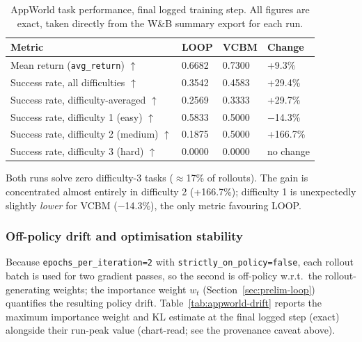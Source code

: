 \begin{table}[H]
  \centering
  \caption{AppWorld task performance, final logged training step. All figures are exact, taken directly from the W\&B summary export for each run.}
  \label{tab:appworld-results}
  \begin{tabularx}{\linewidth}{@{}l Z Z Z@{}}
    \toprule
    \textbf{Metric}                                & \textbf{LOOP} & \textbf{VCBM} & \textbf{Change} \\
    \midrule
    Mean return (\texttt{avg\_return}) $\uparrow$  & 0.6682        & 0.7300        & +9.3\%          \\
    Success rate, all difficulties $\uparrow$      & 0.3542        & 0.4583        & +29.4\%         \\
    Success rate, difficulty-averaged $\uparrow$   & 0.2569        & 0.3333        & +29.7\%         \\
    Success rate, difficulty 1 (easy) $\uparrow$   & 0.5833        & 0.5000        & $-$14.3\%       \\
    Success rate, difficulty 2 (medium) $\uparrow$ & 0.1875        & 0.5000        & +166.7\%        \\
    Success rate, difficulty 3 (hard) $\uparrow$   & 0.0000        & 0.0000        & no change       \\
    \bottomrule
  \end{tabularx}
\end{table}

Both runs solve zero difficulty-3 tasks ($\approx$17\% of rollouts). The gain is concentrated almost entirely in difficulty 2 (+166.7\%); difficulty 1 is unexpectedly slightly \emph{lower} for VCBM ($-$14.3\%), the only metric favouring LOOP.

\subsubsection{Off-policy drift and optimisation stability}
Because \texttt{epochs\_per\_iteration=2} with \texttt{strictly\_on\_policy=false}, each rollout batch is used for two gradient passes, so the second is off-policy w.r.t.\ the rollout-generating weights; the importance weight $w_t$ (Section~\ref{sec:prelim-loop}) quantifies the resulting policy drift. Table~\ref{tab:appworld-drift} reports the maximum importance weight and KL estimate at the final logged step (exact) alongside their run-peak value (chart-read; see the provenance caveat above).

